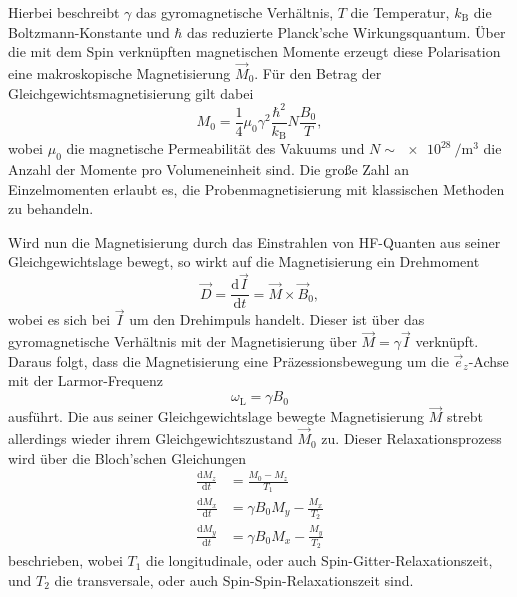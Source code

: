 Hierbei beschreibt $\gamma$ das gyromagnetische Verhältnis, $T$ die Temperatur, $k_\mathrm{B}$ die Boltzmann-Konstante und $\hbar$ das reduzierte Planck'sche Wirkungsquantum. Über die mit dem Spin verknüpften magnetischen Momente erzeugt diese Polarisation eine makroskopische Magnetisierung $\vec{M}_0$. Für den Betrag der Gleichgewichtsmagnetisierung gilt dabei
\begin{equation*}
  M_0 = \frac{1}{4} \mu_0 \gamma^2 \frac{\hbar^2}{k_\mathrm{B}} N \frac{B_0}{T},
\end{equation*}
wobei $\mu_0$ die magnetische Permeabilität des Vakuums und $N \sim \SI{e28}{\per\cubic\metre}$ die Anzahl der Momente pro Volumeneinheit sind. Die große Zahl an Einzelmomenten erlaubt es, die Probenmagnetisierung mit klassischen Methoden zu behandeln.

Wird nun die Magnetisierung durch das Einstrahlen von HF-Quanten aus seiner Gleichgewichtslage bewegt, so wirkt auf die Magnetisierung ein Drehmoment
\begin{equation*}
  \vec{D} = \frac{\mathrm{d}\vec{I}}{\mathrm{d}t} = \vec{M} \times \vec{B}_0,
\end{equation*}
wobei es sich bei $\vec{I}$ um den Drehimpuls handelt. Dieser ist über das gyromagnetische Verhältnis mit der Magnetisierung über $\vec{M} = \gamma \vec{I}$ verknüpft. Daraus folgt, dass die Magnetisierung eine Präzessionsbewegung um die $\vec{e}_z$-Achse mit der Larmor-Frequenz
\begin{equation*}
  \omega_\mathrm{L} = \gamma B_0
\end{equation*}
ausführt. Die aus seiner Gleichgewichtslage bewegte Magnetisierung $\vec{M}$ strebt allerdings wieder ihrem Gleichgewichtszustand $\vec{M}_0$ zu. Dieser Relaxationsprozess wird über die Bloch'schen Gleichungen
\begin{align*}
  \frac{\mathrm{d}M_z}{\mathrm{d}t} &= \frac{M_0 - M_z}{T_1} \\
  \frac{\mathrm{d}M_x}{\mathrm{d}t} &= \gamma B_0 M_y - \frac{M_x}{T_2} \\
  \frac{\mathrm{d}M_y}{\mathrm{d}t} &= \gamma B_0 M_x - \frac{M_y}{T_2}
\end{align*}
beschrieben, wobei $T_1$ die longitudinale, oder auch Spin-Gitter-Relaxationszeit, und $T_2$ die transversale, oder auch Spin-Spin-Relaxationszeit sind.

